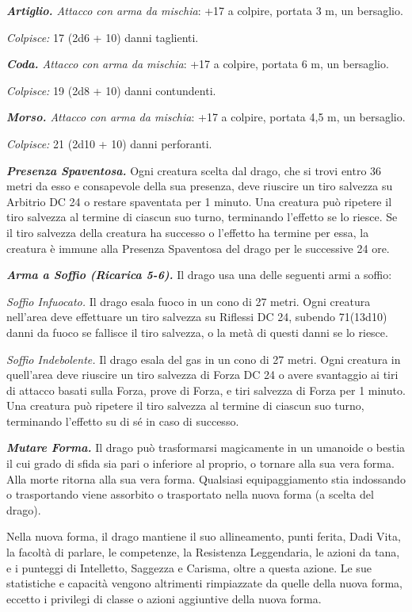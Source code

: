\begin{multicols}{2}
\emph{\textbf{Artiglio.} Attacco con arma da mischia}: +17 a colpire,
portata 3 m, un bersaglio.

\emph{Colpisce:} 17 (2d6 + 10) danni taglienti.

\emph{\textbf{Coda.} Attacco con arma da mischia}: +17 a colpire,
portata 6 m, un bersaglio.

\emph{Colpisce:} 19 (2d8 + 10) danni contundenti.

\emph{\textbf{Morso.} Attacco con arma da mischia}: +17 a colpire,
portata 4,5 m, un bersaglio.

\emph{Colpisce:} 21 (2d10 + 10) danni perforanti.

\emph{\textbf{Presenza Spaventosa.}} Ogni creatura scelta dal drago, che
si trovi entro 36 metri da esso e consapevole della sua presenza, deve
riuscire un tiro salvezza su Arbitrio DC 24 o restare spaventata per 1
minuto. Una creatura può ripetere il tiro salvezza al termine di ciascun
suo turno, terminando l'effetto se lo riesce. Se il tiro salvezza della
creatura ha successo o l'effetto ha termine per essa, la creatura è
immune alla Presenza Spaventosa del drago per le successive 24 ore.

\emph{\textbf{Arma a Soffio (Ricarica 5-6).}} Il drago usa una delle
seguenti armi a soffio:

\emph{Soffio Infuocato.} Il drago esala fuoco in un cono di 27 metri.
Ogni creatura nell'area deve effettuare un tiro salvezza su Riflessi DC
24, subendo 71(13d10) danni da fuoco se fallisce il tiro salvezza, o la
metà di questi danni se lo riesce.

\emph{Soffio Indebolente.} Il drago esala del gas in un cono di 27
metri. Ogni creatura in quell'area deve riuscire un tiro salvezza di Forza DC 24 o avere svantaggio ai tiri di attacco basati sulla Forza,
prove di Forza, e tiri salvezza di Forza per 1 minuto. Una creatura può
ripetere il tiro salvezza al termine di ciascun suo turno, terminando
l'effetto su di sé in caso di successo.

\emph{\textbf{Mutare Forma.}} Il drago può trasformarsi magicamente in
un umanoide o bestia il cui grado di sfida sia pari o inferiore al
proprio, o tornare alla sua vera forma. Alla morte ritorna alla sua vera
forma. Qualsiasi equipaggiamento stia indossando o trasportando viene
assorbito o trasportato nella nuova forma (a scelta del drago).

Nella nuova forma, il drago mantiene il suo allineamento, punti ferita,
Dadi Vita, la facoltà di parlare, le competenze, la Resistenza
Leggendaria, le azioni da tana, e i punteggi di Intelletto, Saggezza e
Carisma, oltre a questa azione. Le sue statistiche e capacità vengono
altrimenti rimpiazzate da quelle della nuova forma, eccetto i privilegi
di classe o azioni aggiuntive della nuova forma.


\end{multicols}
